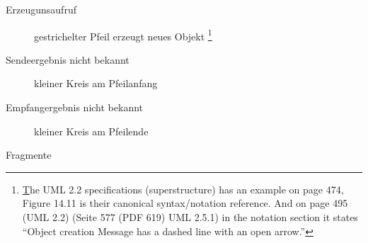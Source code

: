 \documentclass{lehramt-informatik-haupt}
\begin{document}
\begin{description}
\item[Erzeugunsaufruf]
gestrichelter Pfeil erzeugt neues Objekt
%
\footnote{\href{https://stackoverflow.com/a/2128192} The UML 2.2
specifications (superstructure) has an example on page 474, Figure 14.11
is their canonical syntax/notation reference. And on page 495 (UML 2.2)
(Seite 577 (PDF 619) UML 2.5.1) in the notation section it states
“Object creation Message has a dashed line with an open arrow.”}


\item[Sendeergebnis nicht bekannt]
kleiner Kreis am Pfeilanfang

\item[Empfangergebnis nicht bekannt]
kleiner Kreis am Pfeilende

\item[Fragmente] \strut


\end{description}

\literatur
\end{document}
